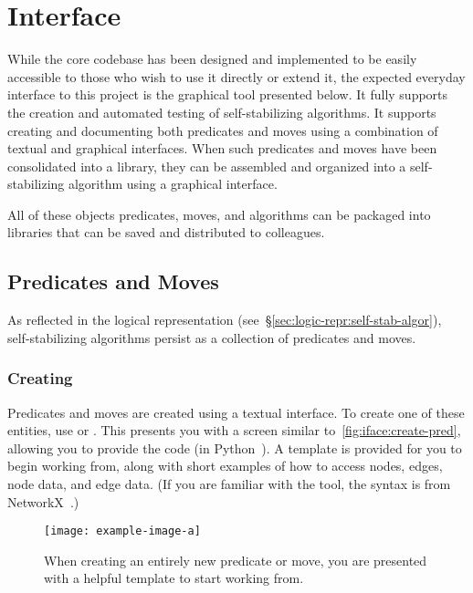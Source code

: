 \section{Interface}
\label{sec:interface-ssa}

While the core codebase has been designed and implemented
  to be easily accessible to those who wish to use it directly or extend it,
  the expected everyday interface to this project is
  the graphical tool presented below.
It fully supports the creation and automated testing of self-stabilizing algorithms.
It supports creating and documenting both predicates and moves
  using a combination of textual and graphical interfaces.
When such predicates and moves have been consolidated into a library,
  they can be assembled and organized into a self-stabilizing algorithm
  using a graphical interface.

All of these objects \Dash
  predicates, moves, and algorithms \Dash
  can be packaged into libraries that can be
  saved and distributed to colleagues.

\subsection{Predicates and Moves}
As reflected in the logical representation
  (see~\S\ref{sec:logic-repr:self-stab-algor}),
  self-stabilizing algorithms persist as a collection
  of predicates and moves.

\subsubsection{Creating}
Predicates and moves are created using a textual interface.
To create one of these entities,
  use 
   or .
This presents you with a screen similar to~\autoref{fig:iface:create-pred},
  allowing you to provide the code (in Python~\autocite{python3:ref}).
A template is provided for you to begin working from,
  along with short examples of how to access nodes, edges, node data, and edge data.
(If you are familiar with the tool,
  the syntax is from NetworkX~\autocite{hagberg:networkx}.)
\begin{figure}
  \centering
  \texttt{[image: example-image-a]}
  \caption{When creating an entirely new predicate or move,
    you are presented with a helpful template to start working from.}
  \label{fig:iface:create-pred}
\end{figure}

